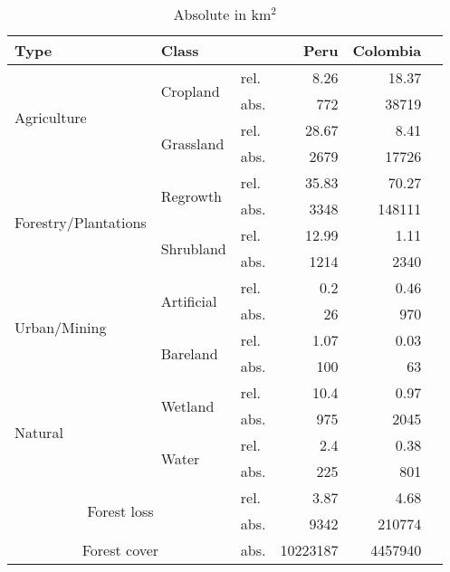 \begin{table}[ht]
	\centering
    \caption[Deforestation driver]{Absolute in km$^2$}
    \label{tab:driver_tab}
    \begin{tabular}{lllrrr} 	Type & Class & & Peru & Colombia \\\hline
        \multirow{4}{*}{Agriculture} & \multirow{2}{*}{Cropland} & rel. & 8.26 & 18.37 \\
        & & abs. & 772 & 38719 \\
        & \multirow{2}{*}{Grassland} & rel. & 28.67 & 8.41 \\
        & & abs. & 2679 & 17726 \\
        \multirow{4}{*}{Forestry/Plantations} & \multirow{2}{*}{Regrowth} & rel. & 35.83 & 70.27 \\
        & & abs. & 3348 & 148111 \\
        & \multirow{2}{*}{Shrubland} & rel. & 12.99 & 1.11 \\
        & & abs. & 1214 & 2340 \\
        \multirow{4}{*}{Urban/Mining} & \multirow{2}{*}{Artificial} & rel. & 0.2 & 0.46 \\
        & & abs. & 26 & 970 \\
        & \multirow{2}{*}{Bareland} & rel. & 1.07 & 0.03 \\
        & & abs. & 100 & 63 \\
        \multirow{4}{*}{Natural} & \multirow{2}{*}{Wetland} & rel. & 10.4 & 0.97 \\
        & & abs. & 975 & 2045 \\
        & \multirow{2}{*}{Water} & rel. & 2.4 & 0.38 \\
        & & abs. & 225 & 801 \\\hline
        \multicolumn{2}{c}{\multirow{2}{*}{Forest loss}} & rel. & 3.87 & 4.68 \\
        & & abs. & 9342 & 210774 \\
        \multicolumn{2}{c}{Forest cover} & abs. & 10223187 & 4457940\\\hline
    \end{tabular}
\end{table}